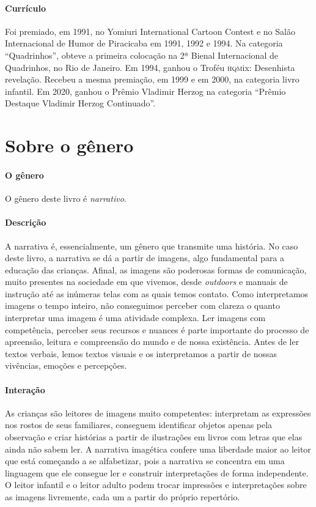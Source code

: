 \documentclass[11pt]{extarticle}
\begin{document}
\paragraph{Currículo} Foi premiado, em 1991, no Yomiuri International Cartoon Contest e no Salão Internacional de Humor de Piracicaba em 1991, 1992 e 1994. Na categoria ``Quadrinhos'', obteve a primeira colocação na 2ª Bienal Internacional de Quadrinhos, no Rio de Janeiro. Em 1994, ganhou o Troféu \textsc{hqm}ix: Desenhista revelação. Recebeu a mesma premiação, em 1999 e em 2000, na categoria livro infantil.
Em 2020, ganhou o Prêmio Vladimir Herzog na categoria ``Prêmio Destaque Vladimir Herzog Continuado''.

\section{Sobre o gênero}

\paragraph{O gênero} O gênero deste livro é \textit{narrativo}. 


\paragraph{Descrição} 
A narrativa é, essencialmente, um gênero que transmite uma história.
No caso deste livro, a narrativa se dá a partir de imagens, algo fundamental para a educação das crianças. Afinal, as imagens são poderosas formas de comunicação, 
muito presentes na sociedade em que vivemos, desde \textit{outdoors} e manuais de 
instrução até as inúmeras telas com as quais temos contato. Como interpretamos 
imagens o tempo inteiro, não conseguimos perceber com clareza o quanto 
interpretar uma imagem é uma atividade complexa. Ler imagens com competência, 
perceber seus recursos e nuances é parte importante do processo de apreensão, 
leitura e compreensão do mundo e de nossa existência. Antes de ler textos 
verbais, lemos textos visuais e os interpretamos a partir de nossas vivências, 
emoções e percepções.

\paragraph{Interação} As crianças são leitores de imagens 
muito competentes: interpretam as expressões nos rostos de seus familiares, 
conseguem identificar objetos apenas pela observação e criar histórias a partir 
de ilustrações em livros com letras que elas ainda não sabem ler. A narrativa imagética 
confere uma liberdade maior ao leitor que está começando a se alfabetizar, pois a narrativa se concentra em uma linguagem que ele consegue ler e construir interpretações de forma 
independente. O leitor infantil e o leitor adulto podem trocar impressões e 
interpretações sobre as imagens livremente, cada um a partir do 
próprio repertório.
\end{document}
